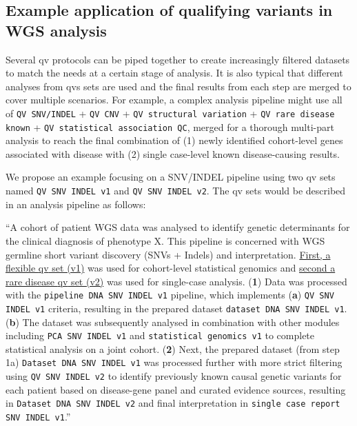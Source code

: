 \subsection{Example application of qualifying variants in WGS analysis}

Several \ac{qv} protocols can be piped together to create increasingly filtered datasets to match the needs at a certain stage of analysis. It is also typical that different analyses from \ac{qv}s sets are used and the final results from each step are merged to cover multiple scenarios. For example, a complex analysis pipeline might use all of
\colorbox{kispiblue!30}{\texttt{QV SNV/INDEL}} + 
\colorbox{kispiblue!30}{\texttt{QV CNV}} + 
\colorbox{kispiblue!30}{\texttt{QV structural variation}} + 
\colorbox{kispiblue!30}{\texttt{QV rare disease known}} + 
\colorbox{kispiblue!30}{\texttt{QV statistical association QC}}, merged for a thorough multi-part analysis to reach the final combination of (1) newly identified cohort-level genes associated with disease with (2) single case-level known disease-causing results.

We propose an example focusing on a SNV/INDEL pipeline using two \ac{qv} sets named 
\colorbox{colorSUNSET2!60}{\texttt{QV SNV INDEL v1}} and
\colorbox{colorSUNSET2!60}{\texttt{QV SNV INDEL v2}}.
The \ac{qv} sets would be described in an analysis pipeline as follows:

``A cohort of patient WGS data was analysed to identify genetic determinants for the clinical diagnosis of phenotype X. 
This pipeline is concerned with WGS germline short variant discovery (SNVs + Indels) and interpretation.
\underline{First, a flexible \ac{qv} set (v1)} was used for cohort-level statistical genomics and \underline{second a rare disease \ac{qv} set (v2)} was used for single-case analysis.
(\textbf{1}) Data was processed with the 
\colorbox{colorSUNSET1!30}{\texttt{pipeline DNA SNV INDEL v1}} pipeline, which implements
(\textbf{a}) \colorbox{colorSUNSET2!60}{\texttt{QV SNV INDEL v1}} criteria, resulting in the prepared dataset
\colorbox{colorSUNSET3!30}{\texttt{dataset DNA SNV INDEL v1}}.
(\textbf{b}) The dataset was subsequently analysed in combination with other modules including 
\colorbox{colorSUNSET4!30}{\texttt{PCA SNV INDEL v1}} and 
\colorbox{colorSUNSET5!30}{\texttt{statistical genomics v1}} to complete statistical analysis on a joint cohort.
(\textbf{2}) Next, 
 the prepared dataset (from step 1a)
\colorbox{colorSUNSET3!30}{\texttt{Dataset DNA SNV INDEL v1}} was processed further with more strict filtering using
\colorbox{colorSUNSET2!60}{\texttt{QV SNV INDEL v2}} to identify previously known causal genetic variants for each patient based on disease-gene panel and curated evidence sources, resulting in \colorbox{colorSUNSET3!30}{\texttt{Dataset DNA SNV INDEL v2}} and final interpretation in
\colorbox{colorSUNSET5!30}{\texttt{single case report SNV INDEL v1}}.''

